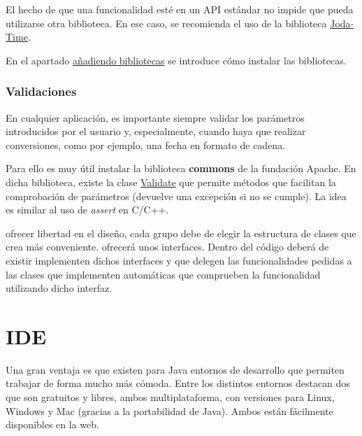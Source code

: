 \documentclass[11pt]{article}
\begin{document}
El hecho de que una funcionalidad esté en un API estándar no impide que pueda
utilizarse otra biblioteca. En ese caso, se recomienda el uso de la biblioteca
\href{http://joda-time.sourceforge.net/}{Joda-Time}.

En el apartado \hyperref[sec-5]{añadiendo bibliotecas} se introduce cómo
instalar las bibliotecas.

\subsubsection{Validaciones} \label{sec-2-2-3} En cualquier aplicación, es
importante siempre validar los parámetros introducidos por el usuario y,
especialmente, cuando haya que realizar conversiones, como por ejemplo, una
fecha en formato de cadena.

Para ello es muy útil instalar la biblioteca \textbf{commons} de la fundación
Apache. En dicha biblioteca, existe la clase
\href{http://commons.apache.org/lang/api-2.5/org/apache/commons/lang/Validate.html}{Validate}
que permite métodos que facilitan la comprobación de parámetros (devuelve una
excepción si no se cumple). La idea es similar al uso de \emph{assert} en C/C++.


ofrecer libertad en el diseño, cada grupo debe de elegir la estructura de clases
que crea más conveniente. %
ofrecerá unos interfaces. Dentro del código deberá de existir %
implementen dichos interfaces y que delegen las funcionalidades pedidas a las
clases que implementen %
automáticas que comprueben la funcionalidad utilizando dicho interfaz.


\section{IDE} \label{sec-3} \label{ide}

Una gran ventaja es que existen para Java entornos de desarrollo que permiten
trabajar de forma mucho más cómoda. Entre los distintos entornos destacan dos
que son gratuitos y libres, ambos multiplataforma, con versiones para Linux,
Windows y Mac (gracias a la portabilidad de Java). Ambos están fácilmente
disponibles en la web.
\end{document}
